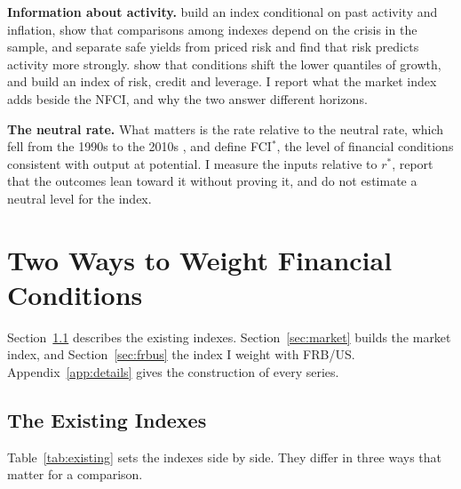 \documentclass[11pt]{article}
\newcommand{\rs}{r^{*}}
\begin{document}
\textbf{Information about activity.} \citet{hatzius2010} build an index conditional on past activity and inflation, \citet{aramonte2013} show that comparisons among indexes depend on the crisis in the sample, and \citet{lombardi2025} separate safe yields from priced risk and find that risk predicts activity more strongly. \citet{adrian2019} show that conditions shift the lower quantiles of growth, and \citet{brave2011} build an index of risk, credit and leverage. I report what the market index adds beside the NFCI, and why the two answer different horizons.

\textbf{The neutral rate.} What matters is the rate relative to the neutral rate, which fell from the 1990s to the 2010s \citep{laubach2003,holston2017,holston2023,hamilton2016,bauer2020,kiley2020}, and \citet{caballero2026} define FCI$^*$, the level of financial conditions consistent with output at potential. I measure the inputs relative to $\rs$, report that the outcomes lean toward it without proving it, and do not estimate a neutral level for the index.
\FloatBarrier
\section{Two Ways to Weight Financial Conditions}\label{sec:indexes}
Section~\ref{sec:existing} describes the existing indexes. Section~\ref{sec:market} builds the market index, and Section~\ref{sec:frbus} the index I weight with FRB/US. Appendix~\ref{app:details} gives the construction of every series.

\subsection{The Existing Indexes}\label{sec:existing}
Table~\ref{tab:existing} sets the indexes side by side. They differ in three ways that matter for a comparison.
\end{document}
